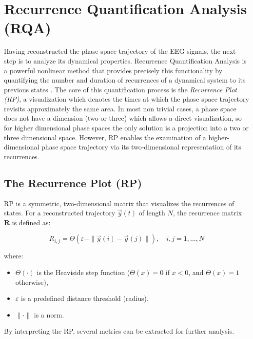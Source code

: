 \documentclass{article}
\begin{document}
					
	\newpage
				\section{Recurrence Quantification Analysis (RQA)}

				Having reconstructed the phase space trajectory of the EEG signals, 
				the next step is to analyze its dynamical properties. 
				Recurrence Quantification Analysis is a powerful nonlinear method that 
				provides precisely this functionality by quantifying the number and duration 
				of recurrences of a dynamical system to its previous states \cite{theoryReviewRQA}. 
				The core of this quantification process is the \emph{Recurrence Plot (RP)}, 
				a visualization which denotes the times at which the phase space 
				trajectory revisits approximately the same area.
				In most non trivial cases, a phase space  does not have a dimension (two or three)
				which allows a direct visualization, so for higher dimensional phase spaces 
				the only solution is a projection into a two or three dimensional space. 
				However, RP enables the examination of a higher-dimensional phase space trajectory 
				via its two-dimensional representation of its recurrences.

				\subsection{The Recurrence Plot (RP)}

				RP is a symmetric, two-dimensional matrix that visualizes the recurrences of states.
				For a reconstructed trajectory \(\vec{y}(t)\) of length \(N\), 
				the recurrence matrix \(\mathbf{R}\) is defined as:

				\begin{equation}
				R_{i,j} = \Theta(\varepsilon - \|\vec{y}(i) - \vec{y}(j)\|), \quad i,j = 1, \ldots, N
				\end{equation}

				where:
				\begin{itemize}
				    \item \(\Theta(\cdot)\) is the Heaviside step function (\(\Theta(x)=0\) if \(x<0\), and \(\Theta(x)=1\) otherwise),
				    \item \(\varepsilon\) is a predefined distance threshold (radius),
				    \item \(\|\cdot\|\) is a norm.
				\end{itemize}
	
				By interpreting the RP, several metrics can be extracted for further analysis.
				
\end{document}

